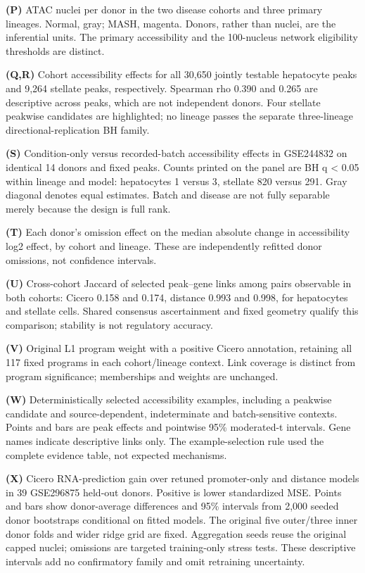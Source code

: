 \textbf{(P)} ATAC nuclei per donor in the two disease cohorts and three primary lineages. Normal, gray; MASH, magenta. Donors, rather than nuclei, are the inferential units. The primary accessibility and the 100-nucleus network eligibility thresholds are distinct.

\textbf{(Q,R)} Cohort accessibility effects for all 30,650 jointly testable hepatocyte peaks and 9,264 stellate peaks, respectively. Spearman rho 0.390 and 0.265 are descriptive across peaks, which are not independent donors. Four stellate peakwise candidates are highlighted; no lineage passes the separate three-lineage directional-replication BH family.

\textbf{(S)} Condition-only versus recorded-batch accessibility effects in GSE244832 on identical 14 donors and fixed peaks. Counts printed on the panel are BH q \textless{} 0.05 within lineage and model: hepatocytes 1 versus 3, stellate 820 versus 291. Gray diagonal denotes equal estimates. Batch and disease are not fully separable merely because the design is full rank.

\textbf{(T)} Each donor's omission effect on the median absolute change in accessibility log2 effect, by cohort and lineage. These are independently refitted donor omissions, not confidence intervals.

\textbf{(U)} Cross-cohort Jaccard of selected peak--gene links among pairs observable in both cohorts: Cicero 0.158 and 0.174, distance 0.993 and 0.998, for hepatocytes and stellate cells. Shared consensus ascertainment and fixed geometry qualify this comparison; stability is not regulatory accuracy.

\textbf{(V)} Original L1 program weight with a positive Cicero annotation, retaining all 117 fixed programs in each cohort/lineage context. Link coverage is distinct from program significance; memberships and weights are unchanged.

\textbf{(W)} Deterministically selected accessibility examples, including a peakwise candidate and source-dependent, indeterminate and batch-sensitive contexts. Points and bars are peak effects and pointwise 95\% moderated-t intervals. Gene names indicate descriptive links only. The example-selection rule used the complete evidence table, not expected mechanisms.

\textbf{(X)} Cicero RNA-prediction gain over retuned promoter-only and distance models in 39 GSE296875 held-out donors. Positive is lower standardized MSE. Points and bars show donor-average differences and 95\% intervals from 2,000 seeded donor bootstraps conditional on fitted models. The original five outer/three inner donor folds and wider ridge grid are fixed. Aggregation seeds reuse the original capped nuclei; omissions are targeted training-only stress tests. These descriptive intervals add no confirmatory family and omit retraining uncertainty.

